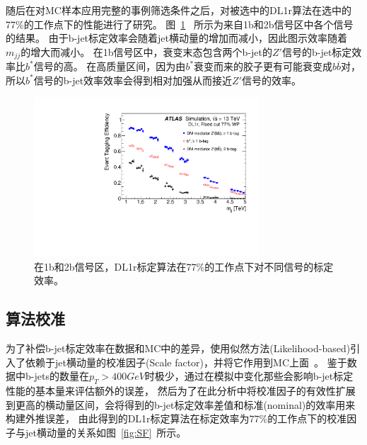 随后在对MC样本应用完整的事例筛选条件之后，对被选中的DL1r算法在选中的77\%的工作点下的性能进行了研究。
图~\ref{fig:beff}~ 所示为来自1b和2b信号区中各个信号的结果。
由于b-jet标定效率会随着jet横动量的增加而减小，因此图示效率随着$m_{jj}$的增大而减小。
在1b信号区中，衰变末态包含两个b-jet的$Z'$信号的b-jet标定效率比$b^*$信号的高。
在高质量区间，因为由$b^*$衰变而来的胶子更有可能衰变成$b\overline{b}$对，所以$b^*$信号的b-jet效率效率会得到相对加强从而接近$Z'$信号的效率。　

\begin{figure}[htbp]
  \centering
  \includegraphics[width=0.75\textwidth]{figs/fig_02.pdf}
  \caption{在1b和2b信号区，DL1r标定算法在77\%的工作点下对不同信号的标定效率。}
  \label{fig:beff}
\end{figure}


\subsection{算法校准}
\label{sec:DijetBtagging3}

为了补偿b-jet标定效率在数据和MC中的差异，使用似然方法(Likelihood-based)引入了依赖于jet横动量的校准因子(Scale factor)，并将它作用到MC上面~\cite{FTAG-2018-01}。
鉴于数据中b-jets的数量在$p_{T}>400GeV$时极少，通过在模拟中变化那些会影响b-jet标定性能的基本量来评估额外的误差，
然后为了在此分析中将校准因子的有效性扩展到更高的横动量区间，会将得到的b-jet标定效率差值和标准(nominal)的效率用来构建外推误差，
由此得到的DL1r标定算法在标定效率为$77\%$的工作点下的校准因子与jet横动量的关系如图~\ref{fig:SF}~所示。



